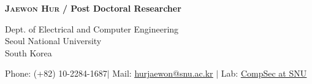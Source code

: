 \documentclass[letterpaper,11pt]{article}
\begin{document}


\begin{center}
    \textbf{\Huge \scshape Jaewon Hur} \textbf{ /  Post Doctoral Researcher} \\ \vspace{10pt}
    
    Dept. of Electrical and Computer Engineering \\
    Seoul National University \\
    South Korea \\ \vspace{10pt}
    
    \small Phone: (+82) 10-2284-1687$|$ Mail: \href{mailto:hurjaewon@snu.ac.kr}{\underline{hurjaewon@snu.ac.kr}} $|$ 
    Lab: \href{https://compsec.snu.ac.kr}{\underline{CompSec at SNU}}
\end{center}

% 
% 
% 
% 
\end{document}
